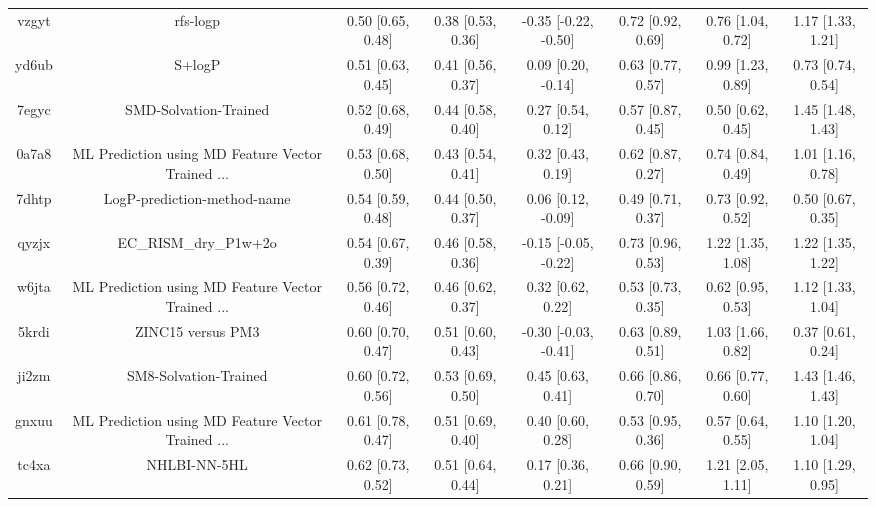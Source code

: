 \documentclass{article}
\begin{document}
\begin{center}
\begin{longtable}{|cccccccc|}
 vzgyt &                                           rfs-logp &  0.50 [0.65, 0.48] &  0.38 [0.53, 0.36] &  -0.35 [-0.22, -0.50] &  0.72 [0.92, 0.69] &     0.76 [1.04, 0.72] &     1.17 [1.33, 1.21] \\
 yd6ub &                                             S+logP &  0.51 [0.63, 0.45] &  0.41 [0.56, 0.37] &    0.09 [0.20, -0.14] &  0.63 [0.77, 0.57] &     0.99 [1.23, 0.89] &     0.73 [0.74, 0.54] \\
 7egyc &                              SMD-Solvation-Trained &  0.52 [0.68, 0.49] &  0.44 [0.58, 0.40] &     0.27 [0.54, 0.12] &  0.57 [0.87, 0.45] &     0.50 [0.62, 0.45] &     1.45 [1.48, 1.43] \\
 0a7a8 &  ML Prediction using MD Feature Vector Trained ... &  0.53 [0.68, 0.50] &  0.43 [0.54, 0.41] &     0.32 [0.43, 0.19] &  0.62 [0.87, 0.27] &     0.74 [0.84, 0.49] &     1.01 [1.16, 0.78] \\
 7dhtp &                        LogP-prediction-method-name &  0.54 [0.59, 0.48] &  0.44 [0.50, 0.37] &    0.06 [0.12, -0.09] &  0.49 [0.71, 0.37] &     0.73 [0.92, 0.52] &     0.50 [0.67, 0.35] \\
 qyzjx &                              EC\_RISM\_dry\_P1w+2o &  0.54 [0.67, 0.39] &  0.46 [0.58, 0.36] &  -0.15 [-0.05, -0.22] &  0.73 [0.96, 0.53] &     1.22 [1.35, 1.08] &     1.22 [1.35, 1.22] \\
 w6jta &  ML Prediction using MD Feature Vector Trained ... &  0.56 [0.72, 0.46] &  0.46 [0.62, 0.37] &     0.32 [0.62, 0.22] &  0.53 [0.73, 0.35] &     0.62 [0.95, 0.53] &     1.12 [1.33, 1.04] \\
 5krdi &                                  ZINC15 versus PM3 &  0.60 [0.70, 0.47] &  0.51 [0.60, 0.43] &  -0.30 [-0.03, -0.41] &  0.63 [0.89, 0.51] &     1.03 [1.66, 0.82] &     0.37 [0.61, 0.24] \\
 ji2zm &                              SM8-Solvation-Trained &  0.60 [0.72, 0.56] &  0.53 [0.69, 0.50] &     0.45 [0.63, 0.41] &  0.66 [0.86, 0.70] &     0.66 [0.77, 0.60] &     1.43 [1.46, 1.43] \\
 gnxuu &  ML Prediction using MD Feature Vector Trained ... &  0.61 [0.78, 0.47] &  0.51 [0.69, 0.40] &     0.40 [0.60, 0.28] &  0.53 [0.95, 0.36] &     0.57 [0.64, 0.55] &     1.10 [1.20, 1.04] \\
 tc4xa &                                       NHLBI-NN-5HL &  0.62 [0.73, 0.52] &  0.51 [0.64, 0.44] &     0.17 [0.36, 0.21] &  0.66 [0.90, 0.59] &     1.21 [2.05, 1.11] &     1.10 [1.29, 0.95] \\

\end{longtable}
\end{center}
\end{document}
